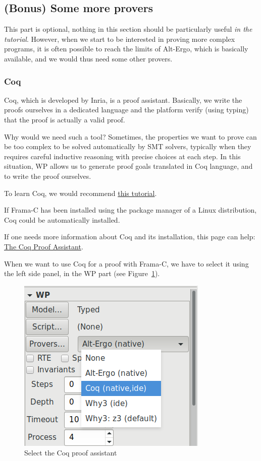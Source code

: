 \documentclass[12pt,francais,]{scrbook}
\newenvironment{zdsblock}[1]{%
  \tcolorbox[beamer,%
    noparskip,breakable,
    colback=LightBlue,colframe=DarkBlue,%
    colbacklower=DarkBlue,%
    title=#1]
}{\endtcolorbox}
\begin{document}
\subsection{(Bonus) Some more provers}\label{bonus-some-more-provers}

This part is optional, nothing in this section should be particularly
useful \emph{in the tutorial}. However, when we start to be interested
in proving more complex programs, it is often possible to reach the
limits of Alt-Ergo, which is basically available, and we would thus need
some other provers.

\subsubsection{Coq}\label{coq}

Coq, which is developed by Inria, is a proof assistant. Basically, we
write the proofs ourselves in a dedicated language and the platform
verify (using typing) that the proof is actually a valid proof.

Why would we need such a tool? Sometimes, the properties we want to
prove can be too complex to be solved automatically by SMT solvers,
typically when they requires careful inductive reasoning with precise
choices at each step. In this situation, WP allows us to generate proof
goals translated in Coq language, and to write the proof ourselves.

To learn Coq, we would recommend
\href{http://www.cis.upenn.edu/~bcpierce/sf/current/index.html}{this
tutorial}.

\begin{zdsblock}{Information}
  If Frama-C has been installed using the package manager of a Linux
  distribution, Coq could be automatically installed.
\end{zdsblock}

If one needs more information about Coq and its installation, this page
can help: \href{https://coq.inria.fr/}{The Coq Proof Assistant}.

When we want to use Coq for a proof with Frama-C, we have to select it
using the left side panel, in the WP part (see Figure~\ref{fig:select_coq}).

\begin{figure}[htbp]
\centering
\includegraphics[scale=0.5]{1-2-select-coq.png}
\caption{Select the Coq proof assistant}
\label{fig:select_coq}
\end{figure}
\end{document}
